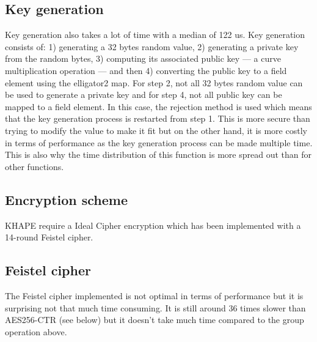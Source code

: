 ﻿\documentclass[../report.tex]{subfiles}
\begin{document}
\subsection{Key generation}
Key generation also takes a lot of time with a median of 122 us. Key generation consists of: 1) generating a 32 bytes random value, 2) generating a private key from the random bytes, 3) computing its associated public key --- a curve multiplication operation --- and then 4) converting the public key to a field element using the elligator2 map.
For step 2, not all 32 bytes random value can be used to generate a private key and for step 4, not all public key can be mapped to a field element.
In this case, the rejection method is used which means that the key generation process is restarted from step 1. This is more secure than trying to modify the value to make it fit but on the other hand, it is more costly in terms of performance as the key generation process can be made multiple time.
This is also why the time distribution of this function is more spread out than for other functions.
\pgfplotsset{width=\textwidth-0.3cm}
\pgfplotsset{height=4cm}


\subsection{Encryption scheme}
KHAPE require a Ideal Cipher encryption which has been implemented with a 14-round Feistel cipher.
\pgfplotsset{width=\textwidth-0.1cm}
\pgfplotsset{height=6cm}
\subsection*{Feistel cipher}
The Feistel cipher implemented is not optimal in terms of performance but it is surprising not that much time consuming.
It is still around 36 times slower than AES256-CTR (see below) but it doesn't take much time compared to the group operation above.
\end{document}
